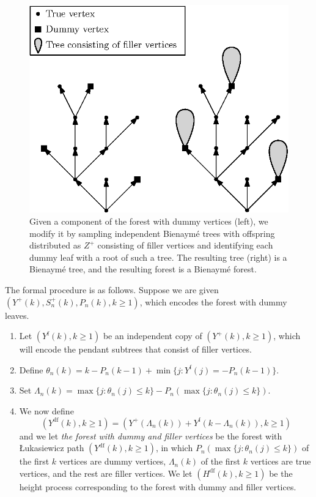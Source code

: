 \begin{figure}
    \centering
    \includegraphics[scale=1]{Content/Pictures/Fig9.eps}
    \caption{Given a component of the forest with dummy vertices (left), we modify it by sampling independent Bienaymé trees with offspring distributed as $Z^+$ consisting of filler vertices and identifying each dummy leaf with a root of such a tree. The resulting tree (right) is a Bienaymé tree, and the resulting forest is a Bienaymé forest.}
    \label{fig.blackpurpleredforest}
\end{figure}
The formal procedure is as follows. Suppose we are given $(Y^+(k),S^{+}_n(k),P_n(k),k\geq 1)$, which encodes the forest with dummy leaves.
\begin{enumerate}
    \item Let $(Y^{\mathrm{f}}(k),k\geq 1)$ be an independent copy of $(Y^+(k),k\geq 1)$, which will encode the pendant subtrees that consist of filler vertices.
    \item Define $\theta_n(k)=k-P_n(k-1)+\min\{j: Y^{\mathrm{f}}(j)=-P_n(k-1)\}$. 
    \item Set $\Lambda_n(k)=\max\{j:\theta_n(j)\leq k\}-P_n(\max\{j:\theta_n(j)\leq k\})$. 
    \item We now define \begin{equation}\label{eq.definitionYdf}(Y^{\mathrm{df}}(k),k\geq 1)=(Y^+(\Lambda_n(k))+Y^{\mathrm{f}}(k-\Lambda_n(k)),k\geq 1)\end{equation}
    and we let \emph{the forest with dummy and filler vertices} be the forest with \L ukasiewicz path $(Y^{\mathrm{df}}(k),k\geq 1)$, in which $P_n(\max\{j:\theta_n(j)\leq k\})$ of the first $k$ vertices are dummy vertices, $\Lambda_n(k)$ of the first $k$ vertices are true vertices, and the rest are filler vertices. We let $(H^{\mathrm{df}}(k),k\geq 1)$ be the height process corresponding to the forest with dummy and filler vertices.
\end{enumerate}
